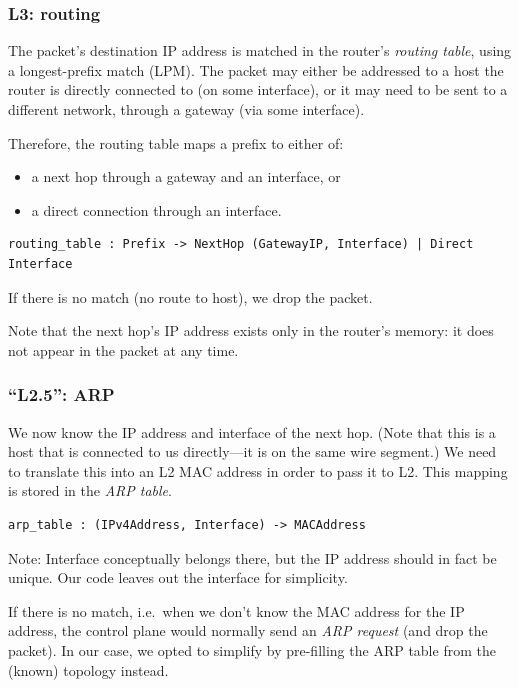 \documentclass[11pt,oneside,a4paper]{article}
\begin{document}
\subsubsection{L3: routing}
The packet's destination IP address is matched in the router's \emph{routing
table}, using a longest-prefix match (LPM).
The packet may either be addressed to a host the router is directly connected to
(on some interface), or it may need to be sent to a different network, through a
gateway (via some interface).

Therefore, the routing table maps a prefix to either of:
\begin{itemize}
\item a next hop through a gateway and an interface, or
\item a direct connection through an interface.
\end{itemize}

\begin{verbatim}
routing_table : Prefix -> NextHop (GatewayIP, Interface) | Direct Interface
\end{verbatim}

If there is no match (no route to host), we drop the packet.

Note that the next hop's IP address exists only in the router's memory: it does
not appear in the packet at any time.

\subsubsection{``L2.5'': ARP}
We now know the IP address and interface of the next hop.
(Note that this is a host that is connected to us directly---it is on the same
wire segment.)
We need to translate this into an L2 MAC address in order to pass it to L2.
This mapping is stored in the \emph{ARP table}.

\begin{verbatim}
arp_table : (IPv4Address, Interface) -> MACAddress
\end{verbatim}

Note: Interface conceptually belongs there, but the IP address should in fact be
unique.
Our code leaves out the interface for simplicity.

If there is no match, i.e.~when we don’t know the MAC address for the IP
address, the control plane would normally send an \emph{ARP request} (and drop
the packet).
In our case, we opted to simplify by pre-filling the ARP table from the (known)
topology instead.
\end{document}

